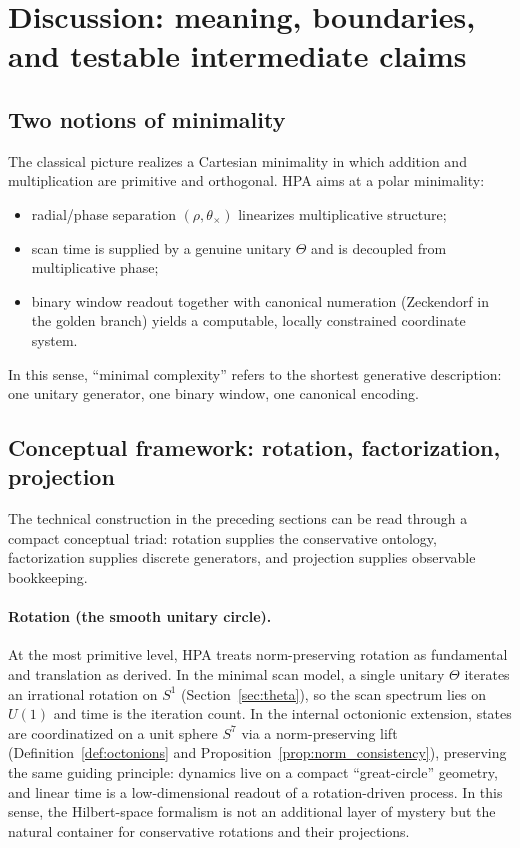 \section{Discussion: meaning, boundaries, and testable intermediate claims}
\label{sec:discussion}

\subsection{Two notions of minimality}
The classical picture realizes a Cartesian minimality in which addition and multiplication are primitive and orthogonal. HPA aims at a polar minimality:

\begin{itemize}
    \item radial/phase separation $(\rho,\theta_\times)$ linearizes multiplicative structure;
    \item scan time is supplied by a genuine unitary $\Theta$ and is decoupled from multiplicative phase;
    \item binary window readout together with canonical numeration (Zeckendorf in the golden branch) yields a computable, locally constrained coordinate system.
\end{itemize}

In this sense, ``minimal complexity'' refers to the shortest generative description: one unitary generator, one binary window, one canonical encoding.

\subsection{Conceptual framework: rotation, factorization, projection}
\label{subsec:conceptual_framework}
The technical construction in the preceding sections can be read through a compact conceptual triad: rotation supplies the conservative ontology, factorization supplies discrete generators, and projection supplies observable bookkeeping.

\paragraph{Rotation (the smooth unitary circle).}
At the most primitive level, HPA treats norm-preserving rotation as fundamental and translation as derived.
In the minimal scan model, a single unitary $\Theta$ iterates an irrational rotation on $S^1$ (Section~\ref{sec:theta}), so the scan spectrum lies on $U(1)$ and time is the iteration count.
In the internal octonionic extension, states are coordinatized on a unit sphere $S^7$ via a norm-preserving lift (Definition~\ref{def:octonions} and Proposition~\ref{prop:norm_consistency}), preserving the same guiding principle: dynamics live on a compact ``great-circle'' geometry, and linear time is a low-dimensional readout of a rotation-driven process.
In this sense, the Hilbert-space formalism is not an additional layer of mystery but the natural container for conservative rotations and their projections.

